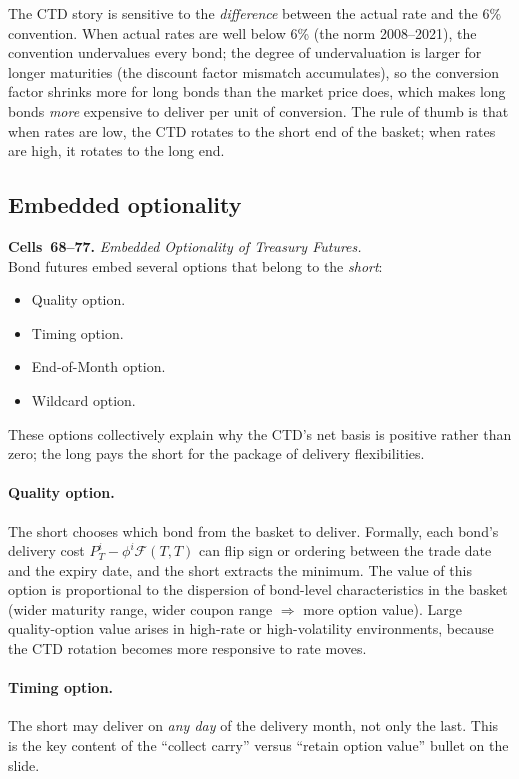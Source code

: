 The CTD story is sensitive to the \emph{difference} between the actual rate
and the 6\% convention. When actual rates are well below 6\% (the norm
2008--2021), the convention undervalues every bond; the degree of
undervaluation is larger for longer maturities (the discount factor
mismatch accumulates), so the conversion factor shrinks more for long
bonds than the market price does, which makes long bonds \emph{more}
expensive to deliver per unit of conversion. The rule of thumb is that
when rates are low, the CTD rotates to the short end of the basket; when
rates are high, it rotates to the long end.

\subsection{Embedded optionality}\label{L4-sec:tf-options}

\begin{keyblock}
\textbf{Cells~68--77.} \emph{Embedded Optionality of Treasury Futures.}\\
Bond futures embed several options that belong to the \emph{short}:
\begin{itemize}
  \item Quality option.
  \item Timing option.
  \item End-of-Month option.
  \item Wildcard option.
\end{itemize}
These options collectively explain why the CTD's net basis is positive
rather than zero; the long pays the short for the package of delivery
flexibilities.
\end{keyblock}

\paragraph{Quality option.} The short chooses which bond from the basket to
deliver. Formally, each bond's delivery cost $P^i_T - \phi^i\mathcal{F}(T,T)$
can flip sign or ordering between the trade date and the expiry date, and
the short extracts the minimum. The value of this option is proportional
to the dispersion of bond-level characteristics in the basket (wider
maturity range, wider coupon range $\Rightarrow$ more option value). Large
quality-option value arises in high-rate or high-volatility environments,
because the CTD rotation becomes more responsive to rate moves.

\paragraph{Timing option.} The short may deliver on \emph{any day} of the
delivery month, not only the last. This is the key content of the
``collect carry'' versus ``retain option value'' bullet on the slide.

